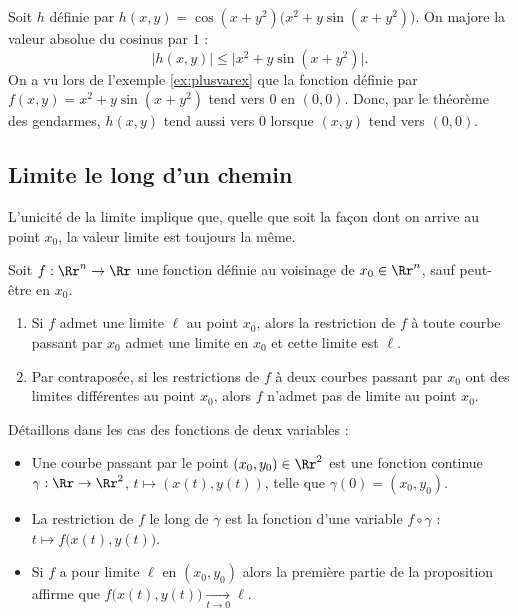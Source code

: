 \documentclass[11pt, class=report,crop=false]{standalone}
\begin{document}
\begin{exemple}
Soit $h$ définie par $h(x,y) = \cos(x+y^2)\big( x^2+y\sin(x+y^2) \big)$.
On majore la valeur absolue du cosinus par $1$ :
$$\big| h(x,y) \big| \le \big|x^2+y\sin(x+y^2)\big| .$$
On a vu lors de l'exemple \ref{ex:plusvarex} que la fonction définie par
$f(x,y) = x^2+y\sin(x+y^2)$ tend vers $0$ en $(0,0)$. 
Donc, par le théorème des gendarmes, $h(x,y)$ tend aussi vers $0$ lorsque $(x,y)$ tend vers $(0,0)$.
\end{exemple}



\subsection{Limite le long d'un chemin}

L'unicité de la limite implique que, quelle que soit la façon dont on arrive au point $x_0$, la valeur limite est toujours la même.

\begin{proposition} Soit $f:\Rr^n\to \Rr$ une fonction définie au voisinage de $x_0 \in \Rr^n$, sauf peut-être en $x_0$.
\begin{enumerate}
\item Si $f$ admet une limite $\ell$ au point $x_0$, alors la restriction de $f$ à toute courbe passant par $x_0$ admet une limite en $x_0$ et cette limite est $\ell$. 
\item Par contraposée, si les restrictions de $f$ à deux courbes passant par $x_0$ ont des limites différentes au point $x_0$, alors $f$ n'admet pas de limite au point $x_0$.
\end{enumerate}
\end{proposition}

Détaillons dans les cas des fonctions de deux variables :
\begin{itemize}
  \item Une courbe passant par le point $(x_0,y_0) \in \Rr^2$ est une fonction continue 
$\gamma : \Rr \to \Rr^2$, $t \mapsto (x(t),y(t))$, telle que $\gamma(0) = (x_0,y_0)$.
  \item La restriction de $f$ le long de $\gamma$ est la fonction d'une variable $f \circ \gamma$ : $t \mapsto f \big( x(t),y(t) \big)$.
  \item Si $f$ a pour limite $\ell$ en $(x_0,y_0)$ alors la première partie de la proposition affirme que 
  $f \big( x(t),y(t) \big) \underset{t \to 0}{\longrightarrow} \ell$.
\end{itemize}
\end{document}
